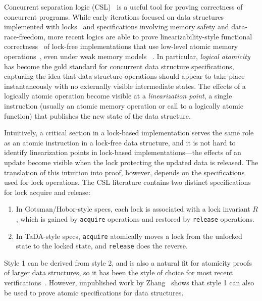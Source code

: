

Concurrent separation logic (CSL)~\cite{csl} is a useful tool for proving correctness of concurrent programs. While early iterations focused on data structures implemented with locks~\cite{gotsman,oraclesematic} and specifications involving memory safety and data-race-freedom, more recent logics are able to prove linearizability-style functional correctness~\cite{tada} of lock-free implementations that use low-level atomic memory operations~\cite{iris}, even under weak memory models~\cite{gps}%
. In particular, \emph{logical atomicity}~\cite{tada} has become the gold standard for concurrent data structure specifications, capturing the idea that data structure operations should appear to take place instantaneously with no externally visible intermediate states. The effects of a logically atomic operation become visible at a \emph{linearization point}, a single instruction (usually an atomic memory operation or call to a logically atomic function) that publishes the new state of the data structure.

Intuitively, a critical section in a lock-based implementation serves the same role as an atomic instruction in a lock-free data structure, and it is not hard to identify linearization points in lock-based implementations---the effects of an update become visible when the lock protecting the updated data is released. The translation of this intuition into proof, however, depends on the specifications used for lock operations. The CSL literature contains two distinct specifications for lock acquire and release:
\begin{enumerate}
\item In Gotsman/Hobor-style specs, each lock is associated with a lock invariant $R$, which is gained by \texttt{acquire} operations and restored by \texttt{release} operations.
\item In TaDA-style specs, \texttt{acquire} atomically moves a lock from the unlocked state to the locked state, and \texttt{release} does the reverse.
\end{enumerate}
Style 1 can be derived from style 2, and is also a natural fit for atomicity proofs of larger data structures, so it has been the style of choice for most recent verifications~\cite{tada-live,templates}. However, unpublished work by Zhang~\cite{atomic-syncer} shows that style 1 can also be used to prove atomic specifications for data structures.

